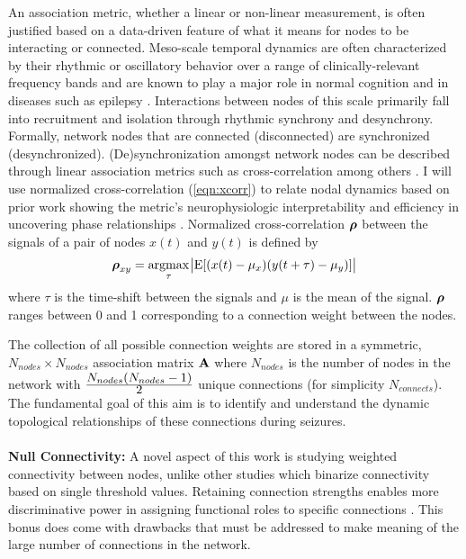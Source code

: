 An association metric, whether a linear or non-linear measurement, is often justified based on a data-driven feature of what it means for nodes to be interacting or connected. Meso-scale temporal dynamics are often characterized by their rhythmic or oscillatory behavior over a range of clinically-relevant frequency bands and are known to play a major role in normal cognition \cite{buzsaki2006rhythms} and in diseases such as epilepsy \cite{uhlhaas2006neural, jiruska2012synchronization}. Interactions between nodes of this scale primarily fall into recruitment and isolation through rhythmic synchrony and desynchrony. Formally, network nodes that are connected (disconnected) are synchronized (desynchronized). (De)synchronization amongst network nodes can be described through linear association metrics such as cross-correlation among others \cite{pereda2005nonlinear}. I will use normalized cross-correlation (\ref{eqn:xcorr}) to relate nodal dynamics based on prior work showing the metric's neurophysiologic interpretability and efficiency in uncovering phase relationships \cite{schiff2005neuronal, kramer2010coalescence}. Normalized cross-correlation $\boldsymbol{\displaystyle \rho}$ between the signals of a pair of nodes $x(t)$ and $y(t)$ is defined by
\begin{eqnarray}
\label{eqn:xcorr}
    \boldsymbol{\displaystyle \rho}_{xy} = \underset{\tau}{\operatorname{argmax}}\:{\abs{\mathrm{E}[(x(t) - \mu_{x})(y(t+\tau) - \mu_{y})]}}
\end{eqnarray}
where $\tau$ is the time-shift between the signals and $\mu$ is the mean of the signal. $\boldsymbol{\displaystyle \rho}$ ranges between 0 and 1 corresponding to a connection weight between the nodes.

The collection of all possible connection weights are stored in a symmetric, $N_{nodes} \times N_{nodes}$ association matrix $\mathbf{\displaystyle A}$ where $N_{nodes}$ is the number of nodes in the network with $\frac{\displaystyle N_{nodes}(N_{nodes}-1)}{\displaystyle 2}$ unique connections (for simplicity $N_{connects}$). The fundamental goal of this aim is to identify and understand the dynamic topological relationships of these connections during seizures.
~\\
~\\
\textbf{Null Connectivity:}
A novel aspect of this work is studying weighted connectivity between nodes, unlike other studies which binarize connectivity based on single threshold values. Retaining connection strengths enables more discriminative power in assigning functional roles to specific connections \cite{bullmore2011brain}. This bonus does come with drawbacks that must be addressed to make meaning of the large number of connections in the network.

